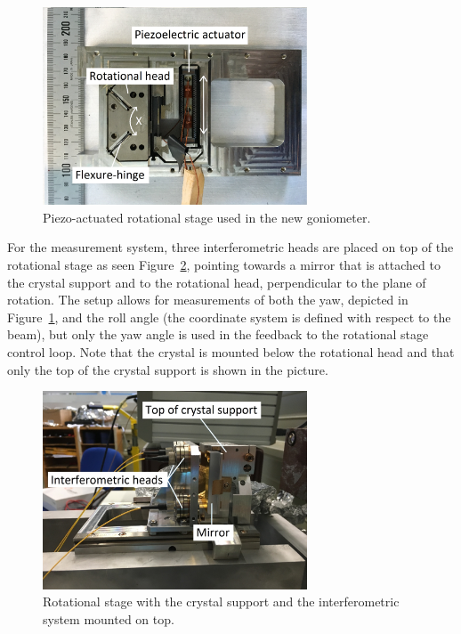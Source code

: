 \begin{figure}[h!]
  \centering
  \includegraphics[width=0.7\textwidth]{fig/rotational-stage.jpg}
  \caption{\label{fig:rotationalstage} Piezo-actuated rotational stage used in the new goniometer.}
\end{figure}

For the measurement system, three interferometric heads are placed on top of the rotational stage as seen Figure~\ref{fig:rotationalstage-side}, pointing towards a mirror that is attached to the crystal support and to the rotational head, perpendicular to the plane of rotation. The setup allows for measurements of both the yaw, depicted in Figure~\ref{fig:rotationalstage}, and the roll angle (the coordinate system is defined with respect to the beam), but only the yaw angle is used in the feedback to the rotational stage control loop. Note that the crystal is mounted below the rotational head and that only the top of the crystal support is shown in the picture.

\begin{figure}[h!]
  \centering
  \includegraphics[width=0.7\textwidth]{fig/rotational-stage-interferometer.jpg}
  \caption{\label{fig:rotationalstage-side} Rotational stage with the crystal support and the interferometric system mounted on top.}
\end{figure}

